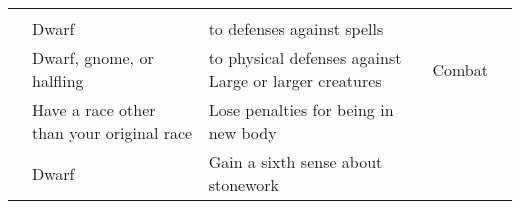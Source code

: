 \begin{longtabuwrapper}
\begin{longtabu}{>{\lcol}p{10em} >{\lcol}p{15em} >{\lcol}X >{\lcol}p{8em} >{\lcol}p{3em}}
        \midrule
         &  &  &  &  \\
         & Dwarf &  to defenses against spells & \x &  \\
         & Dwarf, gnome, or halfling &  to physical defenses against Large or larger creatures & Combat &  \\
         & Have a race other than your original race & Lose penalties for being in new body & \x &  \\
         & Dwarf & Gain a sixth sense about stonework & \x &  \\


\end{longtabu}
\end{longtabuwrapper}
